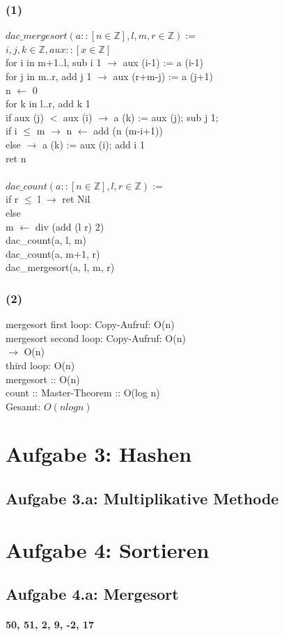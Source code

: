 \documentclass[a4paper,12pt]{article}
\begin{document}
\subsubsection*{(1)}
$dac\_mergesort(a :: [n \in \mathbb{Z}], l, m, r \in \mathbb{Z}) :=$\\
\indent $i, j, k \in \mathbb{Z}, aux :: [x \in \mathbb{Z}]$\\ 
\indent for i in m+1..l, sub i 1 $\rightarrow$ aux (i-1) := a (i-1)\\
\indent for j in m..r, add j 1 $\rightarrow$ aux (r+m-j) := a (j+1)\\
\indent n $\leftarrow$ 0\\
\indent\indent for k in l..r, add k 1\\
\indent\indent\indent if aux (j) $<$ aux (i) $\rightarrow$ a (k) := aux (j); sub j 1; \\
\indent\indent\indent\indent if i $\le$ m $\rightarrow$ n $\leftarrow$ add (n (m-i+1))\\
\indent\indent\indent else $\rightarrow$ a (k) := aux (i); add i 1\\
\indent ret n
\\
\\$dac\_count(a :: [n \in \mathbb{Z}], l, r \in \mathbb{Z}) :=$\\
\indent if r $\le$ l $\rightarrow$ ret Nil\\
\indent else\\
\indent\indent m $\leftarrow$ div (add (l r) 2)\\
\indent\indent dac\_count(a, l, m)\\
\indent\indent dac\_count(a, m+1, r)\\
\indent\indent dac\_mergesort(a, l, m, r)

\subsubsection*{(2)}
mergesort first loop: Copy-Aufruf: O(n)\\
mergesort second loop: Copy-Aufruf: O(n)\\
$\rightarrow$ O(n)\\
third loop: O(n)\\
mergesort :: O(n)\\
count :: Master-Theorem :: O(log n)\\
Gesamt: $O(n log n)$

\section*{Aufgabe 3: Hashen}
\subsection*{Aufgabe 3.a: Multiplikative Methode}

\section*{Aufgabe 4: Sortieren}
\subsection*{Aufgabe 4.a: Mergesort}
\paragraph{50, 51, 2, 9, -2, 17}
\end{document}
